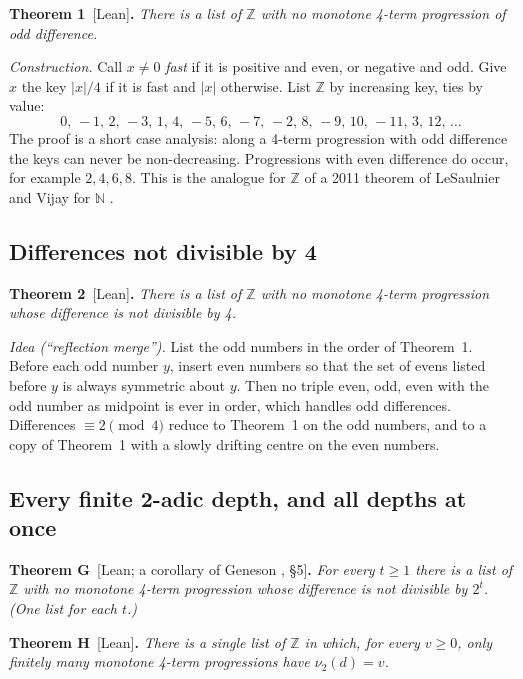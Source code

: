 \documentclass[11pt,letterpaper]{article}
\newcommand{\Z}{\mathbb{Z}}
\newcommand{\N}{\mathbb{N}}
\newcommand{\nut}{\nu_2}
\newcommand{\st}[1]{\textnormal{\textsf{\small[#1]}}}
\newenvironment{result}[2]%
  {\par\medskip\noindent\textbf{#1}\ \st{#2}\textbf{.}\enspace\itshape}%
  {\par\medskip}
\newcommand{\idea}[1]{\par\smallskip\noindent\textit{#1.}\enspace}
\begin{document}
\begin{result}{Theorem 1}{Lean}
There is a list of $\Z$ with no monotone 4-term progression of odd difference.
\end{result}

\idea{Construction} Call $x \neq 0$ \emph{fast} if it is positive and even, or negative and odd. Give $x$
the key $|x|/4$ if it is fast and $|x|$ otherwise. List $\Z$ by increasing key, ties by value:
\[ 0,\,-1,\,2,\,-3,\,1,\,4,\,-5,\,6,\,-7,\,-2,\,8,\,-9,\,10,\,-11,\,3,\,12,\,\dots \]
The proof is a short case analysis: along a 4-term progression with odd difference the keys can never be
non-decreasing. Progressions with even difference do occur, for example $2, 4, 6, 8$. This is the analogue
for $\Z$ of a 2011 theorem of LeSaulnier and Vijay for $\N$ \cite{LV}.

\subsection{Differences not divisible by 4}

\begin{result}{Theorem 2}{Lean}
There is a list of $\Z$ with no monotone 4-term progression whose difference is not divisible by 4.
\end{result}

\idea{Idea (``reflection merge'')} List the odd numbers in the order of Theorem~1. Before each odd number
$y$, insert even numbers so that the set of evens listed before $y$ is always symmetric about $y$. Then no
triple even, odd, even with the odd number as midpoint is ever in order, which handles odd differences.
Differences $\equiv 2 \pmod 4$ reduce to Theorem~1 on the odd numbers, and to a copy of Theorem~1 with a
slowly drifting centre on the even numbers.

\subsection{Every finite 2-adic depth, and all depths at once}

\begin{result}{Theorem G}{Lean; a corollary of Geneson \cite{Gen26}, \S5}
For every $t \ge 1$ there is a list of $\Z$ with no monotone 4-term progression whose difference is not
divisible by $2^t$. (One list for each $t$.)
\end{result}

\begin{result}{Theorem H}{Lean}
There is a single list of $\Z$ in which, for every $v \ge 0$, only finitely many monotone 4-term
progressions have $\nut(d) = v$.
\end{result}
\end{document}
